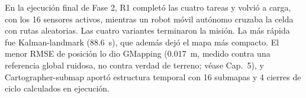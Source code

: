 En la ejecución final de Fase 2, R1 completó las cuatro tareas y volvió a carga,
con los 16 sensores activos, mientras un robot móvil autónomo cruzaba la celda con
rutas aleatorias. Las cuatro variantes terminaron la misión. La más rápida fue
Kalman-landmark (\SI{88.6}{s}), que además dejó el mapa más compacto. El menor
RMSE de posición lo dio GMapping (\SI{0.017}{m}, medido contra una referencia
global ruidosa, no contra verdad de terreno; véase Cap.~5), y Cartographer-submap
aportó estructura temporal con 16 submapas y 4 cierres de ciclo calculados en
ejecución.
